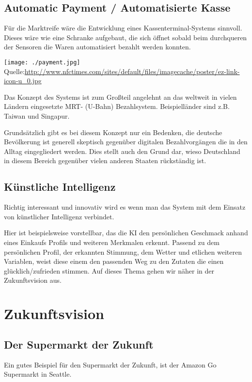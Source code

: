 \documentclass{sigchi}
\begin{document}
\subsection{Automatic Payment / Automatisierte Kasse}
Für die Marktreife wäre die Entwicklung eines Kassenterminal-Systems sinnvoll.
Dieses wäre wie eine Schranke aufgebaut, die sich öffnet sobald beim durchqueren der Sensoren die Waren automatisiert bezahlt werden konnten.

\texttt{[image: ./payment.jpg]}
Quelle:\url{http://www.nfctimes.com/sites/default/files/imagecache/poster/ez-link-icon-u_0.jpg}

Das Konzept des Systems ist zum Großteil angelehnt an das weltweit in vielen Ländern eingesetzte MRT- (U-Bahn) Bezahlsystem.
Beispielländer sind z.B. Taiwan und Singapur.

Grundsätzlich gibt es bei diesem Konzept nur ein Bedenken, die deutsche Bevölkerung ist generell skeptisch gegenüber digitalen Bezahlvorgängen die in den Alltag eingegliedert werden. Dies stellt auch den Grund dar, wieso Deutschland in diesem Bereich gegenüber vielen anderen Staaten rückständig ist.

\subsection{Künstliche Intelligenz}
Richtig interessant und innovativ wird es wenn man das System mit dem Einsatz von künstlicher Intelligenz verbindet.

Hier ist beispielsweise vorstellbar, das die KI den persönlichen Geschmack anhand eines Einkaufs Profils und weiteren Merkmalen erkennt. Passend zu dem persönlichen Profil, der erkannten Stimmung, dem Wetter und etlichen weiteren Variablen, weist diese einem den passenden Weg zu den Zutaten die einen glücklich/zufrieden stimmen.
Auf dieses Thema gehen wir näher in der Zukunftsvision aus.

\section{Zukunftsvision}

\subsection{Der Supermarkt der Zukunft}

Ein gutes Beispiel für den Supermarkt der Zukunft, ist der Amazon Go Supermarkt in Seattle.
\end{document}
